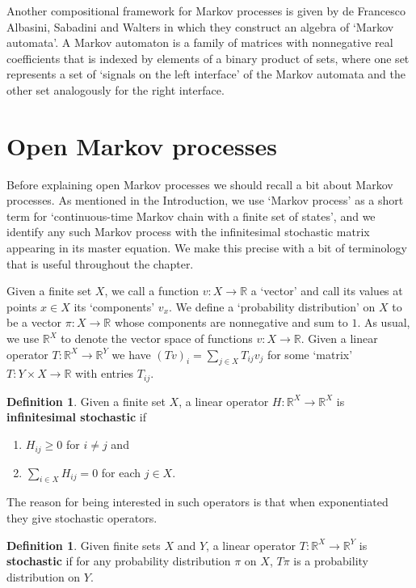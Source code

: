\documentclass[oneside,final]{ucr}
\theoremstyle{definition}
\newtheorem{definition}[theorem]{Definition}
\newcommand{\maps}{\colon}
\newcommand{\R}{\mathbb{R}}
\newcommand{\define}[1]{{\bf \boldmath #1}}
\begin{document}
{Another compositional framework for Markov processes is given by de Francesco Albasini, Sabadini and Walters \cite{Francesco} in which they construct an algebra of `Markov automata'.  A Markov automaton is a family of matrices with nonnegative real coefficients that is indexed by elements of a binary product of sets, where one set represents a set of `signals on the left interface' of the Markov automata and the other set analogously for the right interface.

\section{Open Markov processes}
Before explaining open Markov processes we should recall a bit about Markov processes.  As mentioned in the Introduction, we use `Markov process' as a short term for `continuous-time Markov chain with a finite set of states', and we identify any such Markov process with the
infinitesimal stochastic matrix appearing in its master equation.  We make this precise with a bit 
of terminology that is useful throughout the chapter. 

Given a finite set $X$, we call a function $v \maps X \to \R$ a `vector' and call its values at points $x \in X$ its `components' $v_x$.   We define a `probability distribution' on $X$ to be a vector $\pi \maps X \to \R$ whose components are nonnegative and sum to $1$.  As usual, we use $\R^X$ to denote the vector space of functions $v \maps X \to \R$.    Given a linear operator $T \maps \R^X \to \R^Y$ we have $(T v)_i = \sum_{j \in X} T_{ij} v_j$ for some `matrix' $T \maps Y \times X \to \R$ with entries $T_{ij}$.   

\begin{definition}
Given a finite set $X$, a linear operator $H \maps \R^X \to \R^X$ is \define{infinitesimal stochastic} if
\begin{enumerate}
\item $H_{ij} \geq 0$ for $i \neq j$ and 
\item $\sum_{i \in X} H_{ij}=0$ for each $j \in X$.
\end{enumerate}
\end{definition}

The reason for being interested in such operators is that when exponentiated
they give stochastic operators.

\begin{definition} Given finite sets $X$ and $Y$, a linear operator $T \maps \R^X \to \R^Y$ is \define{stochastic} if for any probability distribution $\pi$ on $X$, $T\pi$ is a probability
distribution on $Y$.
\end{definition}

}
\end{document}
